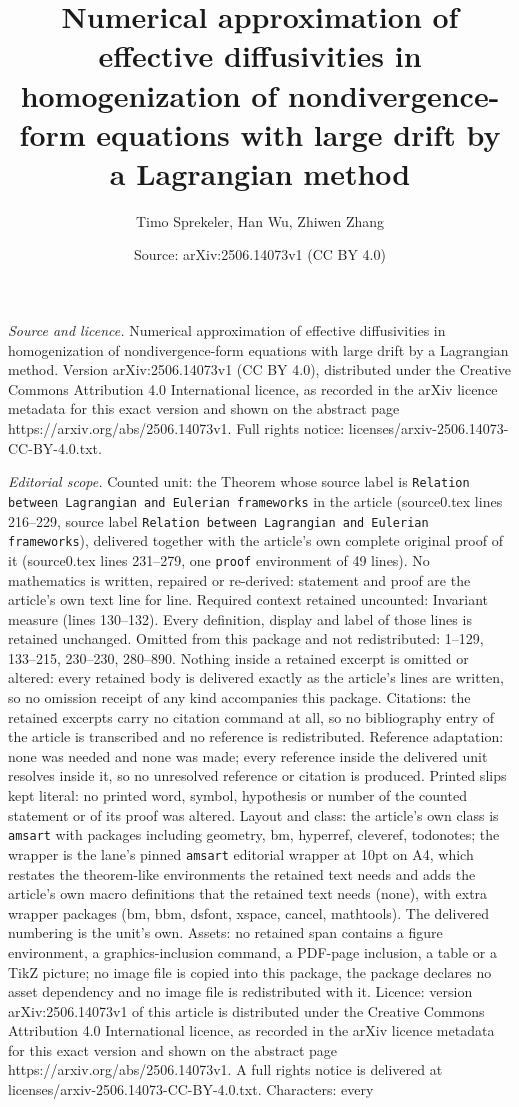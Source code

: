 \documentclass[10pt,a4paper]{amsart}
\title[Numerical approximation of effective diffusivities in homoge]{Numerical approximation of effective diffusivities in homogenization of nondivergence-form equations with large drift by a Lagrangian method}
\author{Timo Sprekeler, Han Wu, Zhiwen Zhang}
\date{Source: arXiv:2506.14073v1 (CC BY 4.0)}
\begin{document}
\maketitle

\noindent\emph{Source and licence.} Numerical approximation of effective diffusivities in homogenization of nondivergence-form equations with large drift by a Lagrangian method. Version arXiv:2506.14073v1 (CC BY 4.0), distributed under the Creative Commons Attribution 4.0 International licence, as recorded in the arXiv licence metadata for this exact version and shown on the abstract page https://arxiv.org/abs/2506.14073v1. Full rights notice: licenses/arxiv-2506.14073-CC-BY-4.0.txt.\par\smallskip

\noindent\textit{Editorial scope.} Counted unit: the Theorem whose source label is \texttt{Relation between Lagrangian and Eulerian frameworks} in the article (source0.tex lines 216--229, source label \texttt{Relation between Lagrangian and Eulerian frameworks}), delivered together with the article's own complete original proof of it (source0.tex lines 231--279, one \texttt{proof} environment of 49 lines). No mathematics is written, repaired or re-derived: statement and proof are the article's own text line for line. Required context retained uncounted: Invariant measure (lines 130--132). Every definition, display and label of those lines is retained unchanged. Omitted from this package and not redistributed: 1--129, 133--215, 230--230, 280--890. Nothing inside a retained excerpt is omitted or altered: every retained body is delivered exactly as the article's lines are written, so no omission receipt of any kind accompanies this package. Citations: the retained excerpts carry no citation command at all, so no bibliography entry of the article is transcribed and no reference is redistributed. Reference adaptation: none was needed and none was made; every reference inside the delivered unit resolves inside it, so no unresolved reference or citation is produced. Printed slips kept literal: no printed word, symbol, hypothesis or number of the counted statement or of its proof was altered. Layout and class: the article's own class is \texttt{amsart} with packages including geometry, bm, hyperref, cleveref, todonotes; the wrapper is the lane's pinned \texttt{amsart} editorial wrapper at 10pt on A4, which restates the theorem-like environments the retained text needs and adds the article's own macro definitions that the retained text needs (none), with extra wrapper packages (bm, bbm, dsfont, xspace, cancel, mathtools). The delivered numbering is the unit's own. Assets: no retained span contains a figure environment, a graphics-inclusion command, a PDF-page inclusion, a table or a TikZ picture; no image file is copied into this package, the package declares no asset dependency and no image file is redistributed with it. Licence: version arXiv:2506.14073v1 of this article is distributed under the Creative Commons Attribution 4.0 International licence, as recorded in the arXiv licence metadata for this exact version and shown on the abstract page https://arxiv.org/abs/2506.14073v1. A full rights notice is delivered at licenses/arxiv-2506.14073-CC-BY-4.0.txt. Characters: every 
\end{document}
